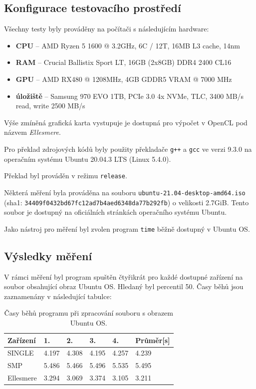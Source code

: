 \documentclass[12pt, a4paper]{article}
\begin{document}
\subsection{Konfigurace testovacího prostředí}
Všechny testy byly prováděny na počítači s následujícím hardware:

\begin{itemize}
    \item \textbf{CPU} -- AMD Ryzen 5 1600 @ 3.2GHz, 6C / 12T, 16MB L3 cache, 14nm 
    \item \textbf{RAM} -- Crucial Ballistix Sport LT, 16GB (2x8GB) DDR4 2400 CL16
    \item \textbf{GPU} -- AMD RX480 @ 1208MHz, 4GB GDDR5 VRAM @ 7000 MHz
    \item \textbf{úložiště} -- Samsung 970 EVO 1TB, PCIe 3.0 4x NVMe, TLC, 3400 MB/s read, write 2500 MB/s
\end{itemize}

Výše zmíněná grafická karta vystupuje je dostupná pro výpočet v OpenCL pod názvem \textit{Ellesmere}.

Pro překlad zdrojových kódů byly použity překladače \texttt{g++} a \texttt{gcc} ve verzi 9.3.0 na operačním systému Ubuntu 20.04.3 LTS (Linux 5.4.0).

Překlad byl prováděn v režimu \texttt{release}.  

Některá měření byla prováděna na souboru \texttt{ubuntu-21.04-desktop-amd64.iso} (sha1: \texttt{34409f0432bd67fc12ad7b4aed6348da77b292fb}) o velikosti 2.7GiB. Tento soubor je dostupný na oficiálních stránkách operačního systému Ubuntu.

Jako nástroj pro měření byl zvolen program \texttt{time} běžně dostupný v Ubuntu OS.

\subsection{Výsledky měření}

V rámci měření byl program spuštěn čtyřikrát pro každé dostupné zařízení na soubor obsahující obraz Ubuntu OS. Hledaný byl percentil 50.
Časy běhů jsou zaznamenány v následující tabulce: 

\begin{table}[!ht]
    \begin{center}
        \begin{tabular}{ | m{6.5em} || m{1.5cm}| m{1.5cm} | m{1.5cm} | m{1.5cm} || m{1.7cm} |} 
             \hline
             Zařízení & 1. & 2. & 3. & 4. & Průměr[s] \\ 

             \hline
             \hline
              SINGLE &  4.197 & 4.308 & 4.195 & 4.257 & 4.239 \\  
              SMP & 5.486 & 5.466 & 5.496 & 5.535 & 5.495 \\
              Ellesmere & 3.294 & 3.069 & 3.374 & 3.105 & 3.211 \\

             \hline
        \end{tabular}
    \end{center}
    \caption{Časy běhů programu při zpracování souboru s obrazem Ubuntu OS.}
\end{table}
\end{document}

